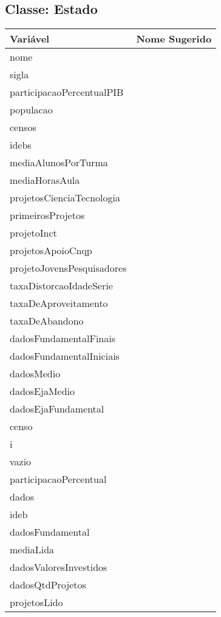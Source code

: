 \documentclass[12pt]{article}
\begin{document}
	\subsection{Classe: Estado}
		\begin{table}[H]
			\begin{center}
				\begin{tabular}{l | l}
					\toprule
						Variável & Nome Sugerido\\
					\midrule
						nome & \\
						sigla & \\
						participacaoPercentualPIB & \\
						populacao & \\
						censos & \\
						idebs & \\
						mediaAlunosPorTurma & \\
						mediaHorasAula & \\
						projetosCienciaTecnologia & \\
						primeirosProjetos & \\
						projetoInct & \\
						projetosApoioCnqp & \\
						projetoJovensPesquisadores & \\
						taxaDistorcaoIdadeSerie & \\
						taxaDeAproveitamento & \\
						taxaDeAbandono & \\
						dadosFundamentalFinais & \\
						dadosFundamentalIniciais & \\
						dadosMedio & \\
						dadosEjaMedio & \\
						dadosEjaFundamental & \\
						censo & \\
						i & \\
						vazio & \\
						participacaoPercentual & \\
						dados & \\
						ideb & \\
						dadosFundamental & \\
						mediaLida & \\
						dadosValoresInvestidos & \\
						dadosQtdProjetos & \\
						projetosLido & \\
					\bottomrule
				\end{tabular}
			\end{center}
		\end{table}
\end{document}
